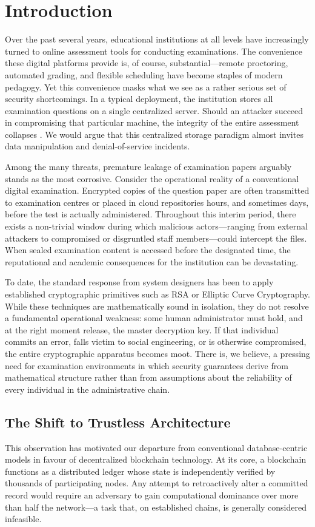 \documentclass[final,5p,times]{elsarticle}
\begin{document}
\section{Introduction}

Over the past several years, educational institutions at all levels have increasingly turned to online assessment tools for conducting examinations. The convenience these digital platforms provide is, of course, substantial—remote proctoring, automated grading, and flexible scheduling have become staples of modern pedagogy. Yet this convenience masks what we see as a rather serious set of security shortcomings. In a typical deployment, the institution stores all examination questions on a single centralized server. Should an attacker succeed in compromising that particular machine, the integrity of the entire assessment collapses \cite{chen2013security}. We would argue that this centralized storage paradigm almost invites data manipulation and denial-of-service incidents.

Among the many threats, premature leakage of examination papers arguably stands as the most corrosive. Consider the operational reality of a conventional digital examination. Encrypted copies of the question paper are often transmitted to examination centres or placed in cloud repositories hours, and sometimes days, before the test is actually administered. Throughout this interim period, there exists a non-trivial window during which malicious actors—ranging from external attackers to compromised or disgruntled staff members—could intercept the files. When sealed examination content is accessed before the designated time, the reputational and academic consequences for the institution can be devastating.

To date, the standard response from system designers has been to apply established cryptographic primitives such as RSA or Elliptic Curve Cryptography. While these techniques are mathematically sound in isolation, they do not resolve a fundamental operational weakness: some human administrator must hold, and at the right moment release, the master decryption key. If that individual commits an error, falls victim to social engineering, or is otherwise compromised, the entire cryptographic apparatus becomes moot. There is, we believe, a pressing need for examination environments in which security guarantees derive from mathematical structure rather than from assumptions about the reliability of every individual in the administrative chain.

\subsection{The Shift to Trustless Architecture}
This observation has motivated our departure from conventional database-centric models in favour of decentralized blockchain technology. At its core, a blockchain functions as a distributed ledger whose state is independently verified by thousands of participating nodes. Any attempt to retroactively alter a committed record would require an adversary to gain computational dominance over more than half the network—a task that, on established chains, is generally considered infeasible.
\end{document}
